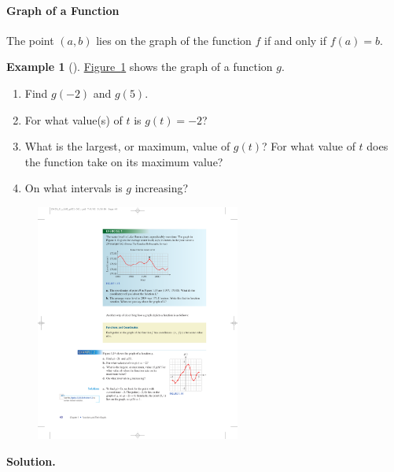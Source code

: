 \documentclass[10pt,]{book}
\theoremstyle{plain}
\theoremstyle{definition}
\theoremstyle{definition}
\theoremstyle{definition}
\newtheorem{example}[theorem]{Example}
\theoremstyle{definition}
\theoremstyle{definition}
\numberwithin{equation}{section}
\begin{document}
\paragraph[Graph of a Function]{Graph of a Function}\label{paragraphs-8}
The point \((a, b)\) lies on the graph of the function \(f\) if and only if \(f(a)=b\).
%
\begin{example}[]\label{example-function-graph}
\hyperref[fig-function]{Figure~\ref{fig-function}} shows the graph of a function \(g\).
    \leavevmode%
\begin{enumerate}[label=*\alph**]
\item\hypertarget{li-121}{}Find \(g(−2)\) and \(g(5)\).\item\hypertarget{li-122}{}For what value(s) of \(t\) is \(g(t) = −2\)?\item\hypertarget{li-123}{}What is the largest, or maximum, value of \(g(t)\)? For what value of \(t\) does the function take on its maximum value?\item\hypertarget{li-124}{}On what intervals is \(g\) increasing?\end{enumerate}
%
\leavevmode%
\begin{figure}
\centering
\includegraphics[width=0.60\textwidth,]{images/fig-function.pdf}\caption{\label{fig-function}}
\end{figure}
\par\medskip\noindent%
\textbf{Solution.}\quad \leavevmode%
\begin{enumerate}[label=*\alph**]

\end{enumerate}
\end{example}
\end{document}
